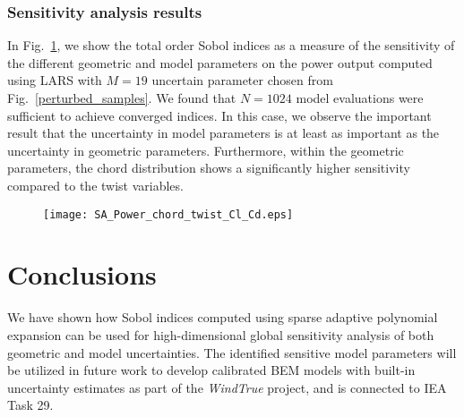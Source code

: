 \subsubsection{Sensitivity analysis results}
In Fig.~\ref{sensitivity_analysis}, we show the total order Sobol indices as a measure of the sensitivity of the different geometric and model parameters on the power output computed using LARS with $M=19$ uncertain parameter chosen from Fig.~\ref{perturbed_samples}. We found that $N=1024$ model evaluations were sufficient to achieve converged indices. In this case, we observe the important result that the uncertainty in model parameters is at least as important as the uncertainty in geometric parameters. Furthermore, within the geometric parameters, the chord distribution shows a significantly higher sensitivity compared to the twist variables.

\begin{figure}[h!]
\centering
\texttt{[image: SA\_Power\_chord\_twist\_Cl\_Cd.eps]}
\caption{}
\label{sensitivity_analysis}
\end{figure}


\section{Conclusions}\label{sec:conclusions}
We have shown how Sobol indices computed using sparse adaptive polynomial expansion can be used for high-dimensional global sensitivity analysis of both geometric and model uncertainties. The identified sensitive model parameters will be utilized in future work to develop calibrated BEM models with built-in uncertainty estimates as part of the \textit{WindTrue} project, and is connected to IEA Task 29.